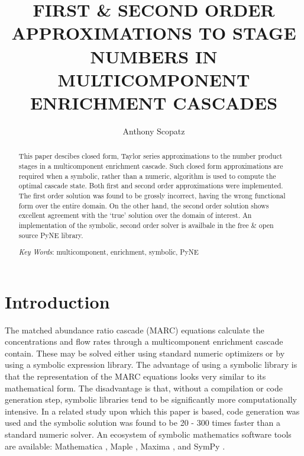 \documentclass{ansconf}
\begin{document}
\title{FIRST \& SECOND ORDER APPROXIMATIONS TO STAGE NUMBERS IN 
       MULTICOMPONENT ENRICHMENT CASCADES}

\author{Anthony Scopatz}

\maketitle

\begin{abstract}
\raggedright
This paper descibes closed form, Taylor series approximations to the number 
product stages in a multicomponent enrichment cascade.  Such closed form 
approximations are required when a symbolic, rather than a numeric, algorithm
is used to compute the optimal cascade state.  Both first and second order 
approximations were implemented.  The first order solution was found to be 
grossly incorrect, having the wrong functional form over the entire domain.
On the other hand, the second order solution shows excellent agreement with 
the `true' solution over the domain of interest. An implementation of the 
symbolic, second order solver is availbale in the free \& open source 
PyNE library.

\emph{Key Words}: multicomponent, enrichment, symbolic, PyNE
\end{abstract}

\section{Introduction}
\label{sec:intro}

The matched abundance ratio cascade (MARC) equations calculate the concentrations
and flow rates through a multicomponent enrichment cascade contain. These may
be solved either using standard numeric optimizers or by using a symbolic 
expression library.  The advantage of using a symbolic library is that the 
representation of the MARC equations looks very similar to its mathematical form.
The disadvantage is that, without a compilation or code generation step, symbolic 
libraries tend to be significantly more computationally intensive.  In a related 
study upon which this paper is based, code generation was used and the symbolic
solution was found to be 20 - 300 times faster than a standard numeric solver.
An ecosystem of symbolic mathematics software tools are available: 
Mathematica \cite{Wolfram2008}, Maple \cite{Maple16},  Maxima \cite{Maxima5}, 
and SymPy \cite{SymPy2012}.  
\end{document}
